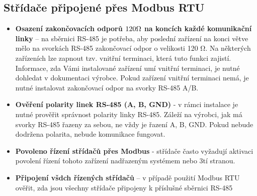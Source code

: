 {{        \subsection{Střídače připojené přes Modbus RTU}
        \begin{itemize}
            \item \textbf{Osazení zakončovacích odporů $120\ohm$ na koncích každé komunikační linky} – na sběrnici RS-485 je potřeba, aby poslední zařízení na konci větve mělo na svorkách RS-485 zakončovací odpor o velikosti 120 Ω. Na některých zařízeních lze zapnout tzv. vnitřní terminaci, která tuto funkci zajistí. Informace, zda Vámi instalované zařízení umí vnitřní terminaci, je nutné dohledat v dokumentaci výrobce. Pokud zařízení vnitřní terminaci nemá, je nutné instalovat zakončovací odpor na svorky RS-485 A/B.
            \item \textbf{Ověření polarity linek RS-485 (A, B, GND)} - v rámci instalace je nutné prověřit správnost polarity linky RS-485. Záleží na výrobci, jak má svorky RS-485 řazeny za sebou, ne vždy je řazení A, B, GND. Pokud nebude dodržena polarita, nebude komunikace fungovat.
            \item \textbf{Povoleno řízení střídačů přes Modbus} - střídače často vyžadují aktivaci povolení řízení tohoto zařízení nadřazeným systémem nebo 3tí stranou.
            \item \textbf{Připojení všdch řízených střídačů} – v případě použití Modbus RTU ověřit, zda jsou všechny střídače připojeny k příslušné sběrnici RS-485
        \end{itemize}
    }


}
